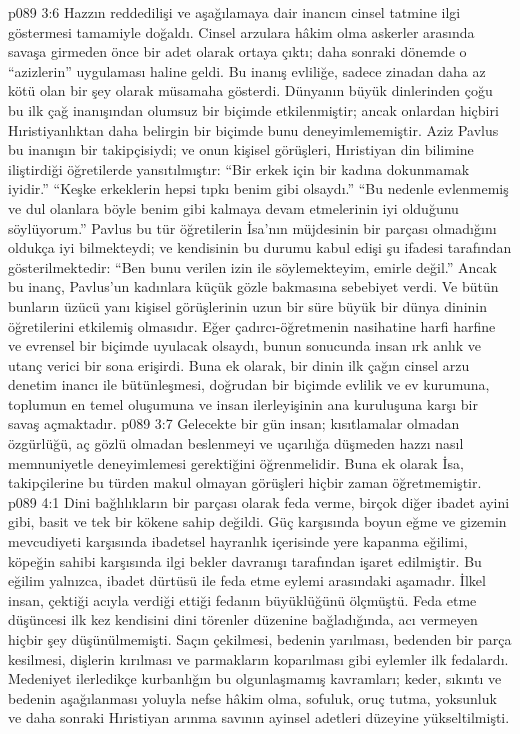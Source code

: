 \vs p089 3:6 Hazzın reddedilişi ve aşağılamaya dair inancın cinsel tatmine ilgi göstermesi tamamiyle doğaldı. Cinsel arzulara hâkim olma askerler arasında savaşa girmeden önce bir adet olarak ortaya çıktı; daha sonraki dönemde o “azizlerin” uygulaması haline geldi. Bu inanış evliliğe, sadece zinadan daha az kötü olan bir şey olarak müsamaha gösterdi. Dünyanın büyük dinlerinden çoğu bu ilk çağ inanışından olumsuz bir biçimde etkilenmiştir; ancak onlardan hiçbiri Hıristiyanlıktan daha belirgin bir biçimde bunu deneyimlememiştir. Aziz Pavlus bu inanışın bir takipçisiydi; ve onun kişisel görüşleri, Hıristiyan din bilimine iliştirdiği öğretilerde yansıtılmıştır: “Bir erkek için bir kadına dokunmamak iyidir.” “Keşke erkeklerin hepsi tıpkı benim gibi olsaydı.” “Bu nedenle evlenmemiş ve dul olanlara böyle benim gibi kalmaya devam etmelerinin iyi olduğunu söylüyorum.” Pavlus bu tür öğretilerin İsa’nın müjdesinin bir parçası olmadığını oldukça iyi bilmekteydi; ve kendisinin bu durumu kabul edişi şu ifadesi tarafından gösterilmektedir: “Ben bunu verilen izin ile söylemekteyim, emirle değil.” Ancak bu inanç, Pavlus’un kadınlara küçük gözle bakmasına sebebiyet verdi. Ve bütün bunların üzücü yanı kişisel görüşlerinin uzun bir süre büyük bir dünya dininin öğretilerini etkilemiş olmasıdır. Eğer çadırcı\hyp{}öğretmenin nasihatine harfi harfine ve evrensel bir biçimde uyulacak olsaydı, bunun sonucunda insan ırk anlık ve utanç verici bir sona erişirdi. Buna ek olarak, bir dinin ilk çağın cinsel arzu denetim inancı ile bütünleşmesi, doğrudan bir biçimde evlilik ve ev kurumuna, toplumun en temel oluşumuna ve insan ilerleyişinin ana kuruluşuna karşı bir savaş açmaktadır.
\vs p089 3:7 Gelecekte bir gün insan; kısıtlamalar olmadan özgürlüğü, aç gözlü olmadan beslenmeyi ve uçarılığa düşmeden hazzı nasıl memnuniyetle deneyimlemesi gerektiğini öğrenmelidir. Buna ek olarak İsa, takipçilerine bu türden makul olmayan görüşleri hiçbir zaman öğretmemiştir.
\vs p089 4:1 Dini bağlılıkların bir parçası olarak feda verme, birçok diğer ibadet ayini gibi, basit ve tek bir kökene sahip değildi. Güç karşısında boyun eğme ve gizemin mevcudiyeti karşısında ibadetsel hayranlık içerisinde yere kapanma eğilimi, köpeğin sahibi karşısında ilgi bekler davranışı tarafından işaret edilmiştir. Bu eğilim yalnızca, ibadet dürtüsü ile feda etme eylemi arasındaki aşamadır. İlkel insan, çektiği acıyla verdiği ettiği fedanın büyüklüğünü ölçmüştü. Feda etme düşüncesi ilk kez kendisini dini törenler düzenine bağladığında, acı vermeyen hiçbir şey düşünülmemişti. Saçın çekilmesi, bedenin yarılması, bedenden bir parça kesilmesi, dişlerin kırılması ve parmakların koparılması gibi eylemler ilk fedalardı. Medeniyet ilerledikçe kurbanlığın bu olgunlaşmamış kavramları; keder, sıkıntı ve bedenin aşağılanması yoluyla nefse hâkim olma, sofuluk, oruç tutma, yoksunluk ve daha sonraki Hıristiyan arınma savının ayinsel adetleri düzeyine yükseltilmişti.

